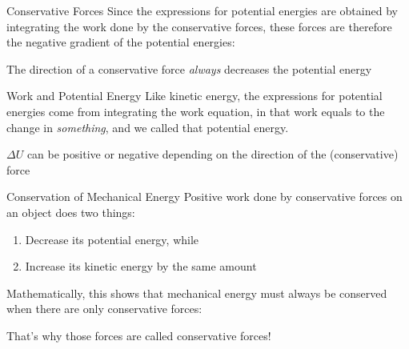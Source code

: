\documentclass[12pt,compress,aspectratio=169]{beamer}
\newcommand{\mb}[1]{\ensuremath\mathbf{#1}}
\newcommand{\eq}[2]{\vspace{#1}{\Large\begin{displaymath}#2\end{displaymath}}}
\begin{document}
\begin{frame}{Conservative Forces}
  Since the expressions for potential energies are obtained by integrating the
  work done by the conservative forces, these forces are therefore the
  negative gradient of the potential energies:

  \eq{-.2in}{
    \boxed{\mb{F}=-\nabla U=
      -\frac{\partial U}{\partial x}\bm{\hat{\imath}}
      -\frac{\partial U}{\partial y}\bm{\hat{\jmath}}
      -\frac{\partial U}{\partial z}\hat{\bm{k}}
    }
  }

  The direction of a conservative force \emph{always} decreases the potential
  energy
\end{frame}




\begin{frame}{Work and Potential Energy}
  Like kinetic energy, the expressions for potential energies come from
  integrating the work equation, in that work equals to the change in
  \emph{something}, and we called that potential energy.

  \eq{-.2in}{
    \boxed{W_\mathrm{net}=-\Delta U}
  }

  $\Delta U$ can be positive or negative depending on the direction of the
  (conservative) force
\end{frame}



\begin{frame}{Conservation of Mechanical Energy}
  Positive work done by conservative forces on an object does two things:
  \begin{enumerate}[1.]
  \item Decrease its potential energy, while
  \item Increase its kinetic energy by the same amount
  \end{enumerate}
  Mathematically, this shows that mechanical energy must always be conserved
  when there are only conservative forces:

  \eq{-.15in}{
    W=-\Delta U = \Delta K \quad\longrightarrow\quad
    \boxed{\Delta K + \Delta U =0}
  }

  That's why those forces are called conservative forces!
\end{frame}
\end{document}
